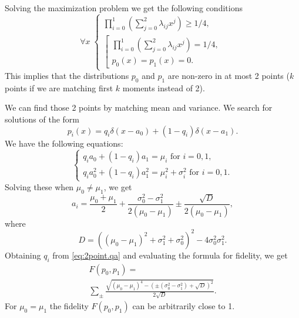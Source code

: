 \documentclass[american,aps,pra,reprint,floatfix,nofootinbib,superscriptaddress]{revtex4-2}
\begin{document}
Solving the maximization problem we get the following conditions
\begin{equation}
  \forall x\;
  \begin{cases}
    \prod_{i=0}^1\left(\sum_{j=0}^2 \lambda_{ij} x^j\right) \geq 1/4, \\
    \left[
      \begin{array}{l}
        \prod_{i=0}^1\left(\sum_{j=0}^2 \lambda_{ij} x^j\right) = 1/4, \\
        p_0(x) = p_1(x) = 0.\phantom{]}
      \end{array}
    \right.
  \end{cases}
\end{equation}
This implies that the distributions $p_0$ and $p_1$ are non-zero in at most 2 points
($k$ points if we are matching first $k$ moments instead of 2).

We can find those 2 points by matching mean and variance. We search for
solutions of the form
\begin{equation}
  p_i(x) = q_i \delta(x-a_0) + (1-q_i) \delta(x-a_1).
\end{equation}
We have the following equations:
\begin{equation}
  \label{eq:2point.qa}
  \begin{cases}
    q_i a_0 + (1-q_i) a_1 = \mu_i\text{ for }i = 0,1,\\
    q_i a_0^2 + (1-q_i) a_1^2 = \mu_i^2 + \sigma_i^2\text{ for }i = 0,1.
  \end{cases}
\end{equation}
Solving these when $\mu_0\neq\mu_1$, we get
\begin{equation}
  a_i = \frac{\mu_0 + \mu_1}{2} + \frac{\sigma_0^2 - \sigma_1^2}{2(\mu_0-\mu_1)}
    \pm \frac{\sqrt{D}}{2(\mu_0-\mu_1)},
\end{equation}
where
\begin{equation}
  D = ((\mu_0-\mu_1)^2+\sigma_1^2+\sigma_0^2)^2-4\sigma_0^2\sigma_1^2.
\end{equation}
Obtaining $q_i$ from \eqref{eq:2point.qa} and evaluating the formula
for fidelity, we get
\begin{multline}
  F(p_0, p_1) =\\
  \sum_{\pm}\frac{
    \sqrt{(\mu_0-\mu_1)^4-(\pm(\sigma_0^2-\sigma_1^2)+\sqrt{D})^2}
  }{2\sqrt{D}}.
\end{multline}
For $\mu_0=\mu_1$ the fidelity $F(p_0,p_1)$ can be arbitrarily close to 1.
\end{document}
